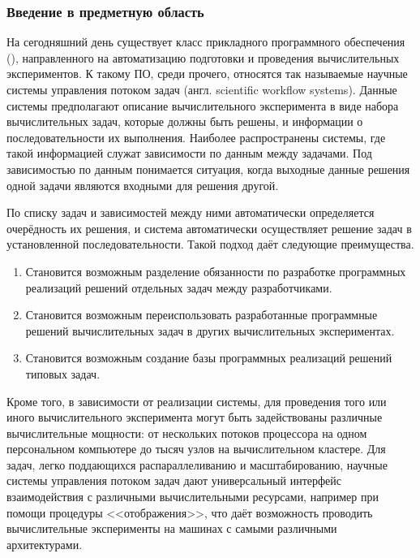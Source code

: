 \def\notedate{2023.01.07}
\def\currentauthor{Тришин И.В. (РК6-11М)}
\subsubsection{Введение в предметную область}

На сегодняшний день существует класс прикладного программного обеспечения (), направленного на автоматизацию подготовки и проведения вычислительных экспериментов. К такому ПО, среди прочего, относятся так называемые научные системы управления потоком задач (англ. scientific workflow systems). Данные системы предполагают описание вычислительного эксперимента в виде набора вычислительных задач, которые должны быть решены, и информации о последовательности их выполнения. Наиболее распространены системы, где такой информацией служат зависимости по данным между задачами. Под зависимостью по данным понимается ситуация, когда выходные данные решения одной задачи являются входными для решения другой.

По списку задач и зависимостей между ними автоматически определяется очерёдность их решения, и система автоматически осуществляет решение задач в установленной последовательности. Такой подход даёт следующие преимущества.
\begin{enumerate}
	\item Становится возможным разделение обязанности по разработке программных реализаций решений отдельных задач между разработчиками.
	\item Становится возможным переиспользовать разработанные программные решений вычислительных задач в других вычислительных экспериментах.
	\item Становится возможным создание базы программных реализаций решений типовых задач.
\end{enumerate}

Кроме того, в зависимости от реализации системы, для проведения того или иного вычислительного эксперимента могут быть задействованы различные вычислительные мощности: от нескольких потоков процессора на одном персональном компьютере до тысяч узлов на вычислительном кластере. Для задач, легко поддающихся распараллеливанию и масштабированию, научные системы управления потоком задач дают универсальный интерфейс взаимодействия с различными вычислительными ресурсами, например при помощи процедуры <<отображения>>\cite{DeelmanWorkflow2009}, что даёт возможность проводить вычислительные эксперименты на машинах с самыми различными архитектурами.


